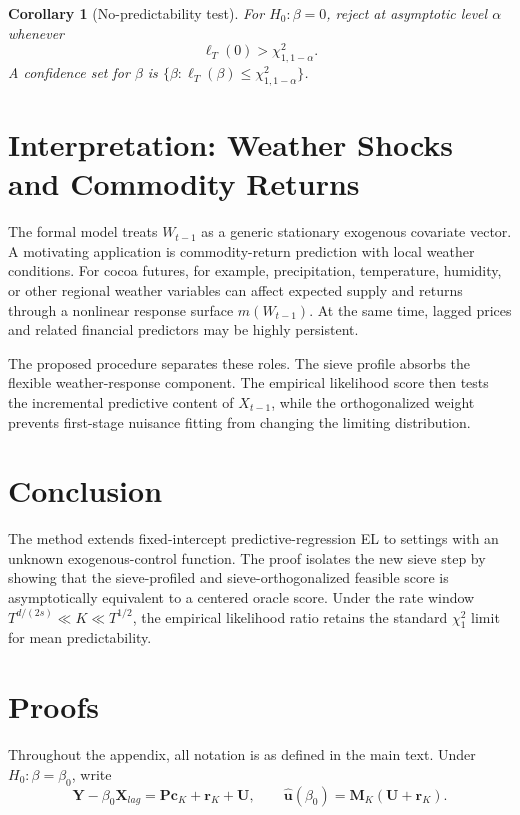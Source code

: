\documentclass[11pt]{article}
\newtheorem{corollary}{Corollary}
\begin{document}
\begin{corollary}[No-predictability test]
For \(H_0:\beta=0\), reject at asymptotic level \(\alpha\) whenever
\[
    \ell_T(0)>\chi^2_{1,1-\alpha}.
\]
A confidence set for \(\beta\) is \(\{\beta:\ell_T(\beta)\leq\chi^2_{1,1-\alpha}\}\).
\end{corollary}

\section{Interpretation: Weather Shocks and Commodity Returns}

The formal model treats \(W_{t-1}\) as a generic stationary exogenous covariate vector. A motivating application is commodity-return prediction with local weather conditions. For cocoa futures, for example, precipitation, temperature, humidity, or other regional weather variables can affect expected supply and returns through a nonlinear response surface \(m(W_{t-1})\). At the same time, lagged prices and related financial predictors may be highly persistent.

The proposed procedure separates these roles. The sieve profile absorbs the flexible weather-response component. The empirical likelihood score then tests the incremental predictive content of \(X_{t-1}\), while the orthogonalized weight prevents first-stage nuisance fitting from changing the limiting distribution.

\section{Conclusion}

The method extends fixed-intercept predictive-regression EL to settings with an unknown exogenous-control function. The proof isolates the new sieve step by showing that the sieve-profiled and sieve-orthogonalized feasible score is asymptotically equivalent to a centered oracle score. Under the rate window \(T^{d/(2s)}\ll K\ll T^{1/2}\), the empirical likelihood ratio retains the standard \(\chi_1^2\) limit for mean predictability.

\appendix
\section{Proofs}
\label{app:proofs}

Throughout the appendix, all notation is as defined in the main text. Under \(H_0:\beta=\beta_0\), write
\[
    \bm Y-\beta_0\bm X_{lag}=\bm P\bm c_K+\bm r_K+\bm U,
    \qquad
    \widehat{\bm u}(\beta_0)=\bm M_K(\bm U+\bm r_K).
\]
\end{document}
